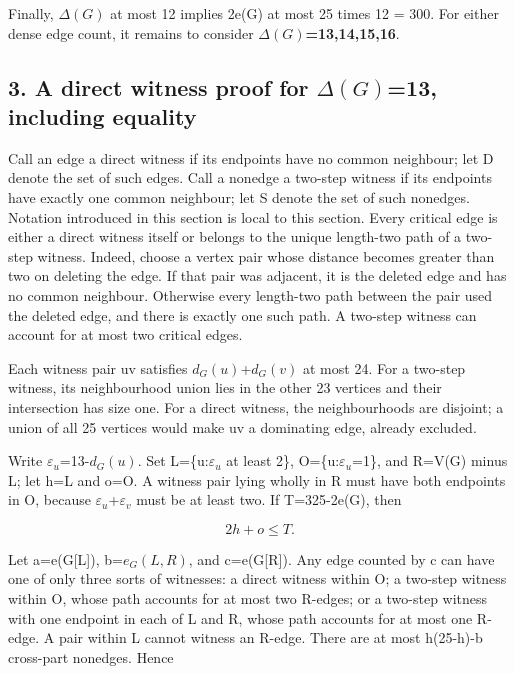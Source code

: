\documentclass[
  11pt,
]{article}
\begin{document}
Finally, \ensuremath{\Delta (G)} at most 12 implies 2e(G) at most 25
times 12 = 300. For either dense edge count, it remains to consider
\textbf{\ensuremath{\Delta (G)}=13,14,15,16}.

\hypertarget{a-direct-witness-proof-for-13-including-equality}{%
\subsection{\texorpdfstring{3. A direct witness proof for
\ensuremath{\Delta (G)}=13, including
equality}{3. A direct witness proof for =13, including equality}}\label{a-direct-witness-proof-for-13-including-equality}}

Call an edge a direct witness if its endpoints have no common neighbour;
let D denote the set of such edges. Call a nonedge a two-step witness if
its endpoints have exactly one common neighbour; let S denote the set of
such nonedges. Notation introduced in this section is local to this
section. Every critical edge is either a direct witness itself or
belongs to the unique length-two path of a two-step witness. Indeed,
choose a vertex pair whose distance becomes greater than two on deleting
the edge. If that pair was adjacent, it is the deleted edge and has no
common neighbour. Otherwise every length-two path between the pair used
the deleted edge, and there is exactly one such path. A two-step witness
can account for at most two critical edges.

Each witness pair uv satisfies \ensuremath{d_G(u)}+\ensuremath{d_G(v)}
at most 24. For a two-step witness, its neighbourhood union lies in the
other 23 vertices and their intersection has size one. For a direct
witness, the neighbourhoods are disjoint; a union of all 25 vertices
would make uv a dominating edge, already excluded.

Write \ensuremath{\varepsilon _u}=13-\ensuremath{d_G(u)}. Set
L=\{u:\ensuremath{\varepsilon _u} at least 2\},
O=\{u:\ensuremath{\varepsilon _u}=1\}, and R=V(G) minus L; let
h=\textbar L\textbar{} and o=\textbar O\textbar. A witness pair lying
wholly in R must have both endpoints in O, because
\ensuremath{\varepsilon _u}+\ensuremath{\varepsilon _v} must be at least
two. If T=325-2e(G), then

\[
2h+o\le T.
\]

Let a=e(G{[}L{]}), b=\ensuremath{e_G(L,R)}, and c=e(G{[}R{]}). Any edge
counted by c can have one of only three sorts of witnesses: a direct
witness within O; a two-step witness within O, whose path accounts for
at most two R-edges; or a two-step witness with one endpoint in each of
L and R, whose path accounts for at most one R-edge. A pair within L
cannot witness an R-edge. There are at most h(25-h)-b cross-part
nonedges. Hence
\end{document}
